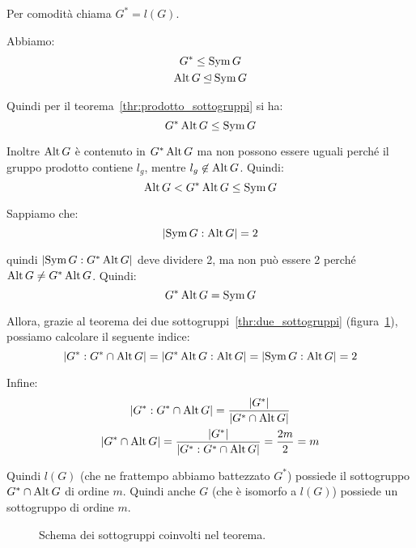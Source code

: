\begin{dimostrazione}
	Per comodità chiama $G^* = l(G)$.
	
	Abbiamo:
	\begin{gather}
		G^* \le \operatorname{Sym} G \\
		\operatorname{Alt} G \unlhd \operatorname{Sym} G
	\end{gather}

	Quindi per il teorema~\ref{thr:prodotto_sottogruppi} si ha:
	\begin{equation*}
		G^* \operatorname{Alt} G \le \operatorname{Sym} G
	\end{equation*}
	
	Inoltre $\operatorname{Alt} G$ è contenuto in $G^* \operatorname{Alt} G$ ma non possono essere uguali perché il gruppo prodotto contiene $l_g$, mentre  $l_g \not\in \operatorname{Alt} G$.
	Quindi:
	\begin{equation*}
		\operatorname{Alt} G < G^* \operatorname{Alt} G \le \operatorname{Sym} G
	\end{equation*}

	Sappiamo che:
	\begin{equation*}
		\lvert \operatorname{Sym} G:\operatorname{Alt} G \rvert = 2
	\end{equation*}

	quindi $\lvert \operatorname{Sym} G:G^* \operatorname{Alt} G \rvert$ deve dividere 2, ma non può essere 2 perché $\operatorname{Alt} G \ne G^* \operatorname{Alt} G$.
	Quindi:
	\begin{equation*}
		G^* \operatorname{Alt} G = \operatorname{Sym} G
	\end{equation*}

	Allora, grazie al teorema dei due sottogruppi~\ref{thr:due_sottogruppi} (figura~\ref{fig:conseguenza_Cayley}), possiamo calcolare il seguente indice:
	\begin{equation*}
		\lvert G^*:G^* \cap \operatorname{Alt} G \rvert = \lvert G^* \operatorname{Alt} G:\operatorname{Alt} G \rvert = \lvert \operatorname{Sym} G:\operatorname{Alt} G \rvert = 2
	\end{equation*}
	
	Infine:
	\begin{gather*}
		\lvert G^*:G^* \cap \operatorname{Alt} G \rvert = \dfrac{\lvert G^* \rvert}{\lvert G^* \cap \operatorname{Alt} G \rvert} \\
		\lvert G^* \cap \operatorname{Alt} G \rvert = \dfrac{\lvert G^* \rvert}{\lvert G^*:G^* \cap \operatorname{Alt} G \rvert} =
		\dfrac{2m}{2} = m
	\end{gather*}
	
	Quindi $l(G)$ (che ne frattempo abbiamo battezzato $G^*$) possiede il sottogruppo $G^* \cap \operatorname{Alt} G$ di ordine $m$. Quindi anche $G$ (che è isomorfo a $l(G)$) possiede un sottogruppo di ordine $m$.
	
\end{dimostrazione}
\begin{figure}[tp]
	\centering
	\caption{Schema dei sottogruppi coinvolti nel teorema.}
	\label{fig:conseguenza_Cayley}
\end{figure}
	
